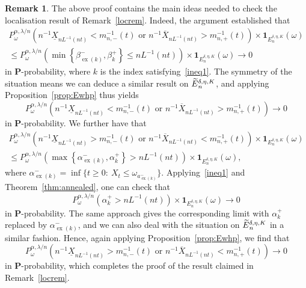 \documentclass[10pt]{amsart}
\theoremstyle{definition}\newtheorem{defi}[theo]{Definition}\newtheorem{rema}[theo]{Remark}\newtheorem{exam}[theo]{Example}\newtheorem{exem}[theo]{Example}\newtheorem{nota}[theo]{Notation}
\newcommand{\bfP}{\mathbf{P}}
\newcommand{\bfun}{\mathbf{1}}
\newcommand\ex{\operatorname{ex}}
\newcommand{\aat}[1]{a_{\ex(#1)}^-}
\newcommand{\betat}[1]{\beta^-_{\ex(#1)}}
\newcommand{\alphat}[1]{\alpha^-_{\ex(#1)}}
\let\oldtilde\tilde
\renewcommand*{\tilde}[1]{\mathchoice{\widetilde{#1}}{\widetilde{#1}}{\oldtilde{#1}}{\oldtilde{#1}}}
\begin{document}
\begin{rema}\label{locremproof}
The above proof contains the main ideas needed to check the localisation result of Remark~\ref{locrem}. Indeed, the argument established that
\begin{multline*}
{P}^{\alpha,\lambda/n}_\omega\left(n^{-1}\underline{X}_{nL^{-1}(n t)}<m_{n,-}^{-1}(t)\text{ or }n^{-1}\overline{X}_{nL^{-1}(n t)}>m_{n,+}^{-1}(t)\right)\times\bfun_{E_n^{\delta,\eta,K}}(\omega)\\
\leq{P}^{\alpha,\lambda/n}_\omega\left(\min\left\{\betat{k},{\beta}_k^+\right\}\leq nL^{-1}(nt)\right)\times\bfun_{E_n^{\delta,\eta,K}}(\omega)\rightarrow 0
\end{multline*}
in $\bfP$-probability, where $k$ is the index satisfying~\eqref{ineq1}. The symmetry of the situation means we can deduce a similar result on $\tilde{E}_n^{\delta,\eta,K}$, and applying Proposition~\ref{prop:Ewhp} thus yields
\[
{P}^{\alpha,\lambda/n}_\omega\left(n^{-1}\underline{X}_{nL^{-1}(n t)}<m_{n,-}^{-1}(t)\text{ or }n^{-1}\overline{X}_{nL^{-1}(n t)}>m_{n,+}^{-1}(t)\right)\rightarrow 0
\]
in $\bfP$-probability. We further have that
\begin{multline*}
{P}^{\alpha,\lambda/n}_\omega\left(n^{-1}\underline{X}_{nL^{-1}(n t)}>m_{n,-}^{-1}(t)\text{ or }n^{-1}\overline{X}_{nL^{-1}(n t)}<m_{n,+}^{-1}(t)\right)\times\bfun_{E_n^{\delta,\eta,K}}(\omega)\\
\leq{P}^{\alpha,\lambda/n}_\omega\left(\max\left\{\alphat{k},{\alpha}_k^+\right\}> nL^{-1}(nt)\right)\times\bfun_{E_n^{\delta,\eta,K}}(\omega),
\end{multline*}
where $\alphat{k}=\inf\{t\geq 0:\:X_t\leq \omega_{\aat{k}}\}$. Applying~\eqref{ineq1} and Theorem~\ref{thm:annealed}, one can check that
\[
{P}^{\alpha,\lambda/n}_\omega\left({\alpha}_k^+> nL^{-1}(nt)\right)\times\bfun_{E_n^{\delta,\eta,K}}(\omega)\rightarrow 0
\]
in $\bfP$-probability. The same approach gives the corresponding limit with ${\alpha}_k^+$ replaced by $\alphat{k}$, and we can also deal with the situation on $\tilde{E}_n^{\delta,\eta,K}$ in a similar fashion. Hence, again applying Proposition~\ref{prop:Ewhp}, we find that
\[
{P}^{\alpha,\lambda/n}_\omega\left(n^{-1}\underline{X}_{nL^{-1}(n t)}>m_{n,-}^{-1}(t)\text{ or }n^{-1}\overline{X}_{nL^{-1}(n t)}<m_{n,+}^{-1}(t)\right)\rightarrow 0
\]
in $\bfP$-probability, which completes the proof of the result claimed in Remark~\ref{locrem}.
\end{rema}
\end{document}
